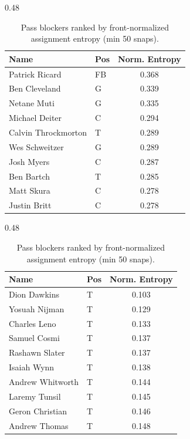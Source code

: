 \begin{table}[h!]
\centering
\begin{subtable}{0.48\textwidth}
\centering
\footnotesize
\begin{tabular}{llc}
\toprule
Name & Pos & Norm. Entropy \\
\midrule
Patrick Ricard & FB & 0.368 \\
Ben Cleveland & G & 0.339 \\
Netane Muti & G & 0.335 \\
Michael Deiter & C & 0.294 \\
Calvin Throckmorton & T & 0.289 \\
Wes Schweitzer & G & 0.289 \\
Josh Myers & C & 0.287 \\
Ben Bartch & T & 0.285 \\
Matt Skura & C & 0.278 \\
Justin Britt & C & 0.278 \\
\bottomrule
\end{tabular}
\caption{Highest (most switching)}
\end{subtable}
\hfill
\begin{subtable}{0.48\textwidth}
\centering
\footnotesize
\begin{tabular}{llc}
\toprule
Name & Pos & Norm. Entropy \\
\midrule
Dion Dawkins & T & 0.103 \\
Yosuah Nijman & T & 0.129 \\
Charles Leno & T & 0.133 \\
Samuel Cosmi & T & 0.137 \\
Rashawn Slater & T & 0.137 \\
Isaiah Wynn & T & 0.138 \\
Andrew Whitworth & T & 0.144 \\
Laremy Tunsil & T & 0.145 \\
Geron Christian & T & 0.146 \\
Andrew Thomas & T & 0.148 \\
\bottomrule
\end{tabular}
\caption{Lowest (stickiest)}
\end{subtable}
\hfill
\caption{Pass blockers ranked by front-normalized assignment entropy (min 50 snaps).}
\label{tab:blocker_entropy}
\end{table}
